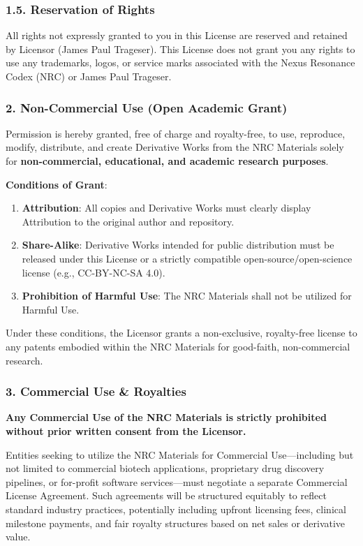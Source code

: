 \documentclass[11pt,a4paper,oneside]{article}
\begin{document}
	\subsubsection*{1.5. Reservation of Rights}
	All rights not expressly granted to you in this License are reserved and retained by Licensor (James Paul Trageser). This License does not grant you any rights to use any trademarks, logos, or service marks associated with the Nexus Resonance Codex (NRC) or James Paul Trageser.

	\subsubsection*{2. Non-Commercial Use (Open Academic Grant)}
	Permission is hereby granted, free of charge and royalty-free, to use, reproduce, modify, distribute, and create Derivative Works from the NRC Materials solely for \textbf{non-commercial, educational, and academic research purposes}.

	\textbf{Conditions of Grant}:
	\begin{enumerate}
		\item \textbf{Attribution}: All copies and Derivative Works must clearly display Attribution to the original author and repository.
		\item \textbf{Share-Alike}: Derivative Works intended for public distribution must be released under this License or a strictly compatible open-source/open-science license (e.g., CC-BY-NC-SA 4.0).
		\item \textbf{Prohibition of Harmful Use}: The NRC Materials shall not be utilized for Harmful Use.
	\end{enumerate}
	Under these conditions, the Licensor grants a non-exclusive, royalty-free license to any patents embodied within the NRC Materials for good-faith, non-commercial research.

	\subsubsection*{3. Commercial Use \& Royalties}
	\textbf{Any Commercial Use of the NRC Materials is strictly prohibited without prior written consent from the Licensor.}

	Entities seeking to utilize the NRC Materials for Commercial Use---including but not limited to commercial biotech applications, proprietary drug discovery pipelines, or for-profit software services---must negotiate a separate Commercial License Agreement. Such agreements will be structured equitably to reflect standard industry practices, potentially including upfront licensing fees, clinical milestone payments, and fair royalty structures based on net sales or derivative value.
\end{document}
